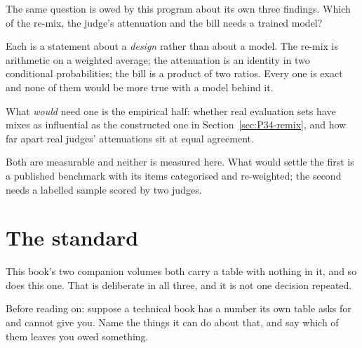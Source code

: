 \begin{fr}
The same question is owed by this program about its own three findings. Which
of the re-mix, the judge's attenuation and the bill needs a trained model?
\dotline
\nextframe
\end{fr}

\begin{fr}

Each is a statement about a \emph{design} rather than about a model. The
re-mix is arithmetic on a weighted average; the attenuation is an identity
in two conditional probabilities; the bill is a product of two ratios. Every
one is exact and none of them would be more true with a model behind it.

\begin{warning}
What \emph{would} need one is the empirical half: whether real evaluation
sets have mixes as influential as the constructed one in
Section~\ref{sec:P34-remix}, and how far apart real judges' attenuations sit
at equal agreement.

Both are measurable and neither is measured here. What would settle the
first is a published benchmark with its items categorised and re-weighted;
the second needs a labelled sample scored by two judges.
\end{warning}
\end{fr}

\section{The standard}
\label{sec:P34-standard}

\begin{fr}
This book's two companion volumes both carry a table with nothing in it, and
so does this one. That is deliberate in all three, and it is not one
decision repeated.

Before reading on: suppose a technical book has a number its own table asks
for and cannot give you. Name the things it can do about that, and say which
of them leaves you owed something.
\dotline
\nextframe
\end{fr}


